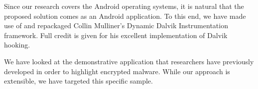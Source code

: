 
Since our research covers the Android operating systems, it is natural that
the proposed solution comes as an Android application. To this end, we have
made use of and repackaged Collin Mulliner's Dynamic Dalvik Instrumentation
framework. Full credit is given for his excellent implementation of Dalvik
hooking.

We have looked at the demonstrative application that researchers have
previously\cite{hiding-apk} developed in order to highlight encrypted malware.
While our approach is extensible, we have targeted this specific sample.
